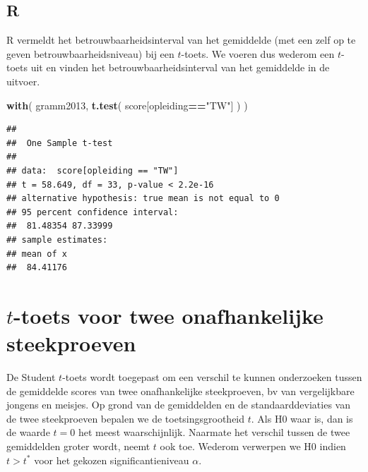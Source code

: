 \documentclass[
]{book}
\newenvironment{Shaded}{\begin{snugshade}}{\end{snugshade}}
\newcommand{\KeywordTok}[1]{\textcolor[rgb]{0.13,0.29,0.53}{\textbf{#1}}}
\newcommand{\NormalTok}[1]{#1}
\newcommand{\OperatorTok}[1]{\textcolor[rgb]{0.81,0.36,0.00}{\textbf{#1}}}
\newcommand{\StringTok}[1]{\textcolor[rgb]{0.31,0.60,0.02}{#1}}
\begin{document}
\hypertarget{r-13}{%
\subsection{R}\label{r-13}}

R vermeldt het betrouwbaarheidsinterval van het gemiddelde (met een zelf
op te geven betrouwbaarheidsniveau) bij een \(t\)-toets. We voeren dus wederom een \(t\)-toets
uit en vinden het betrouwbaarheidsinterval van het gemiddelde in de
uitvoer.

\begin{Shaded}
\begin{Highlighting}[]
\KeywordTok{with}\NormalTok{( gramm2013, }\KeywordTok{t.test}\NormalTok{( score[opleiding}\OperatorTok{==}\StringTok{"TW"}\NormalTok{] ) )}
\end{Highlighting}
\end{Shaded}

\begin{verbatim}
## 
##  One Sample t-test
## 
## data:  score[opleiding == "TW"]
## t = 58.649, df = 33, p-value < 2.2e-16
## alternative hypothesis: true mean is not equal to 0
## 95 percent confidence interval:
##  81.48354 87.33999
## sample estimates:
## mean of x 
##  84.41176
\end{verbatim}

\hypertarget{sec:ttoets-onafh}{%
\section{\texorpdfstring{\(t\)-toets voor twee onafhankelijke steekproeven}{t-toets voor twee onafhankelijke steekproeven}}\label{sec:ttoets-onafh}}

De Student \(t\)-toets wordt toegepast om een verschil te kunnen onderzoeken tussen
de gemiddelde scores van twee onafhankelijke steekproeven, bv van
vergelijkbare jongens en meisjes. Op grond van de gemiddelden en de
standaarddeviaties van de twee steekproeven bepalen we de
toetsingsgrootheid \(t\). Als H0 waar is, dan is de waarde \(t=0\) het meest
waarschijnlijk. Naarmate het verschil tussen de twee gemiddelden groter
wordt, neemt \(t\) ook toe. Wederom verwerpen we H0 indien \(t>t^*\) voor
het gekozen significantieniveau \(\alpha\).
\end{document}
